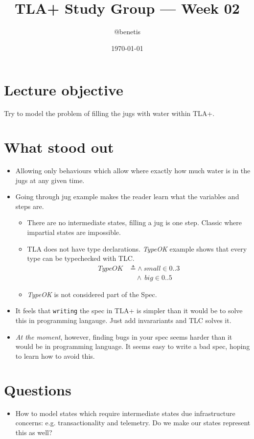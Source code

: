 \documentclass[11pt]{article}
\title{TLA+ Study Group — Week 02}
\author{@benetis}
\date{\today}
\begin{document}
\maketitle

\section*{Lecture objective}
Try to model the problem of filling the jugs with water within TLA+.

\section*{What stood out}
\begin{itemize}
    \item Allowing only behaviours which allow where exactly how much water is in the jugs at any given time. 
    \item Going through jug example makes the reader learn what the variables and steps are.
    \begin{itemize}
        \item There are no intermediate states, filling a jug is one step. Classic where impartial states are impossible.
        \item TLA does not have type declarations. \textit{TypeOK} example shows that every type can be typechecked with TLC.
        \begin{align*}
            \mathit{TypeOK} &\triangleq \land\ \mathit{small} \in 0..3 \\
                             &\quad \land\ \mathit{big} \in 0..5
        \end{align*}
        \item \textit{TypeOK} is not considered part of the Spec.
    \end{itemize}
    \item It feels that \texttt{writing} the spec in TLA+ is simpler than it would be to solve this in programming langauge. Just add invarariants and TLC solves it.
    \item \textit{At the moment}, however, finding bugs in your spec seems harder than it would be in programming language. It seems easy to write a bad spec, hoping to learn how to avoid this.
\end{itemize}

\section*{Questions}
\begin{itemize}
    \item How to model states which require intermediate states due infrastructure concerns: e.g. transactionality and telemetry. Do we make our states represent this as well?
\end{itemize}
\end{document}
